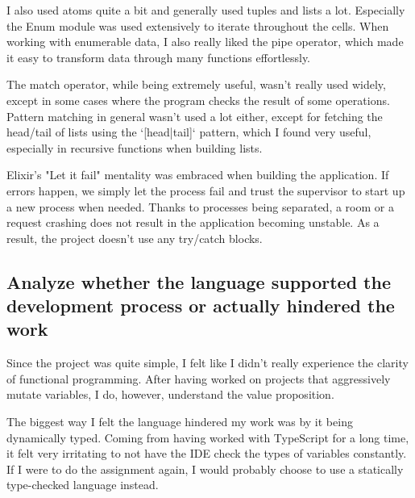 I also used atoms quite a bit and generally used tuples and lists a lot. Especially the Enum module was used extensively to iterate throughout the cells. When working with enumerable data, I also really liked the pipe operator, which made it easy to transform data through many functions effortlessly.

The match operator, while being extremely useful, wasn't really used widely, except in some cases where the program checks the result of some operations. Pattern matching in general wasn't used a lot either, except for fetching the head/tail of lists using the `[head|tail]` pattern, which I found very useful, especially in recursive functions when building lists.

Elixir's "Let it fail" mentality was embraced when building the application. If errors happen, we simply let the process fail and trust the supervisor to start up a new process when needed. Thanks to processes being separated, a room or a request crashing does not result in the application becoming unstable. As a result, the project doesn't use any try/catch blocks.

\subsection{Analyze whether the language supported the development process or actually hindered the work}
Since the project was quite simple, I felt like I didn't really experience the clarity of functional programming. After having worked on projects that aggressively mutate variables, I do, however, understand the value proposition.

The biggest way I felt the language hindered my work was by it being dynamically typed. Coming from having worked with TypeScript for a long time, it felt very irritating to not have the IDE check the types of variables constantly. If I were to do the assignment again, I would probably choose to use a statically type-checked language instead.